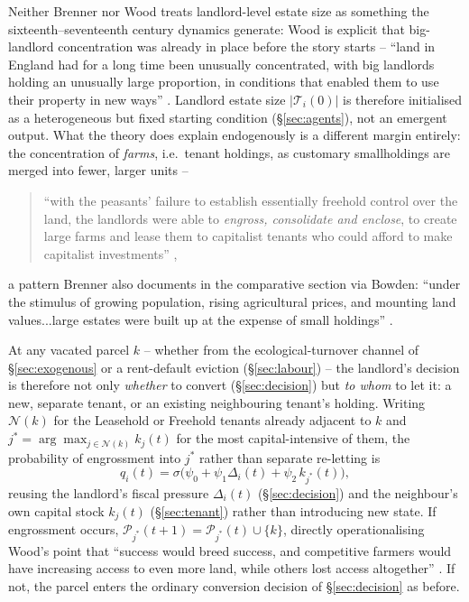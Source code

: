 \documentclass[11pt,english]{article}
\begin{document}
Neither Brenner nor Wood treats landlord-level estate size as something the sixteenth--seventeenth century dynamics generate: Wood is explicit that big-landlord concentration was already in place before the story starts -- ``land in England had for a long time been unusually concentrated, with big landlords holding an unusually large proportion, in conditions that enabled them to use their property in new ways'' \cite[p.99]{wood2002origin}. Landlord estate size $|\mathcal{T}_i(0)|$ is therefore initialised as a heterogeneous but fixed starting condition (\S\ref{sec:agents}), not an emergent output. What the theory does explain endogenously is a different margin entirely: the concentration of \emph{farms}, i.e.\ tenant holdings, as customary smallholdings are merged into fewer, larger units --
\begin{quote}
``with the peasants' failure to establish essentially freehold control over the land, the landlords were able to \emph{engross, consolidate and enclose}, to create large farms and lease them to capitalist tenants who could afford to make capitalist investments'' \cite[p.63]{brenner1976agrarian},
\end{quote}
a pattern Brenner also documents in the comparative section via Bowden: ``under the stimulus of growing population, rising agricultural prices, and mounting land values...large estates were built up at the expense of small holdings'' \cite[p.42]{brenner1976agrarian}.

At any vacated parcel $k$ -- whether from the ecological-turnover channel of \S\ref{sec:exogenous} or a rent-default eviction (\S\ref{sec:labour}) -- the landlord's decision is therefore not only \emph{whether} to convert (\S\ref{sec:decision}) but \emph{to whom} to let it: a new, separate tenant, or an existing neighbouring tenant's holding. Writing $\mathcal{N}(k)$ for the Leasehold or Freehold tenants already adjacent to $k$ and $j^{*} = \arg\max_{j\in\mathcal{N}(k)} k_j(t)$ for the most capital-intensive of them, the probability of engrossment into $j^{*}$ rather than separate re-letting is
\begin{equation}
q_i(t) = \sigma\big(\psi_0 + \psi_1\Delta_i(t) + \psi_2\, k_{j^{*}}(t)\big),
\end{equation}
reusing the landlord's fiscal pressure $\Delta_i(t)$ (\S\ref{sec:decision}) and the neighbour's own capital stock $k_j(t)$ (\S\ref{sec:tenant}) rather than introducing new state. If engrossment occurs, $\mathcal{P}_{j^{*}}(t+1) = \mathcal{P}_{j^{*}}(t)\cup\{k\}$, directly operationalising Wood's point that ``success would breed success, and competitive farmers would have increasing access to even more land, while others lost access altogether'' \cite[p.100-101]{wood2002origin}. If not, the parcel enters the ordinary conversion decision of \S\ref{sec:decision} as before.
\end{document}
